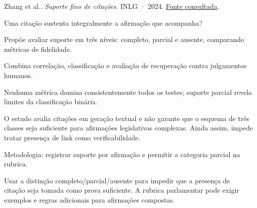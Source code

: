 {\small Zhang et al.. \textit{Suporte fino de citações}. INLG · 2024. \href{https://aclanthology.org/2024.inlg-main.35/}{Fonte consultada}.\par}

Uma citação sustenta integralmente a afirmação que acompanha?

Propõe avaliar suporte em três níveis: completo, parcial e ausente, comparando métricas de fidelidade.

Combina correlação, classificação e avaliação de recuperação contra julgamentos humanos.

Nenhuma métrica domina consistentemente todos os testes; suporte parcial revela limites da classificação binária.

\begin{itemize}
\end{itemize}

O estudo avalia citações em geração textual e não garante que o esquema de três classes seja suficiente para afirmações legislativas complexas. Ainda assim, impede tratar presença de link como verificabilidade.

Metodologia: registrar suporte por afirmação e permitir a categoria parcial na rubrica.

Usar a distinção completo/parcial/ausente para impedir que a presença de citação seja tomada como prova suficiente. A rubrica parlamentar pode exigir exemplos e regras adicionais para afirmações compostas.

